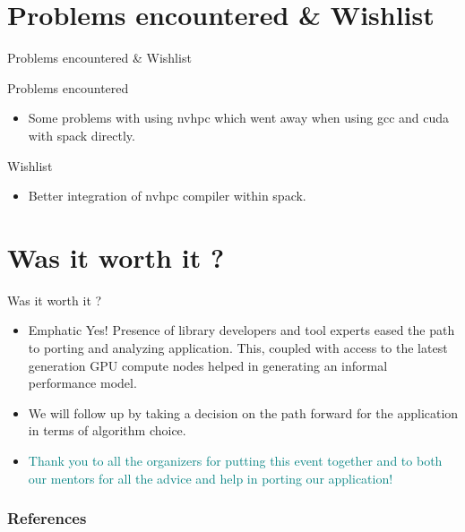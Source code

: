 \documentclass{beamer}
\begin{document}
\section{Problems encountered \& Wishlist} 
\begin{frame}{Problems encountered \& Wishlist}
  \begin{block}{Problems encountered}
  	\begin{itemize}
	  \item Some problems with using nvhpc which went away when using gcc and cuda with spack directly.
    \end{itemize}
  \end{block}	
  \begin{exampleblock}{Wishlist}
	\begin{itemize}
		\item Better integration of nvhpc compiler within spack.
	\end{itemize}
  \end{exampleblock}		
\end{frame}

\section{Was it worth it ?} 
\begin{frame}{Was it worth it ?} 
	\begin{itemize}
	\item Emphatic Yes! Presence of library developers and tool experts eased the path to porting and analyzing application. This, coupled with access to the latest generation GPU compute nodes helped in generating an informal performance model.
	\item We will follow up by taking a decision on the path forward for the application in terms of algorithm choice.
	\item  	\textcolor{teal}{Thank you to all the organizers for putting this event together and to both our mentors for all the advice and help in porting our application!}
	\end{itemize}	
	
\end{frame}

\renewcommand*{\bibfont}{\scriptsize}
\begin{frame}[t, allowframebreaks]
	\frametitle{References}
	
	
\end{frame}
\end{document}
